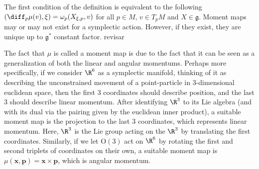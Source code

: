 
The first condition of the definition is equivalent to the following \(  ( \diff_p\mu(v), \xi)=\omega_p(X_{\xi, p}, v)\) for all \(p \in M\), \(v \in T_pM\) and \(X \in \mathfrak{g}\). Moment maps may or may not exist for a symplectic action. However, if they exist, they are unique up to \(\mathfrak{g}^*\) constant factor. {\color{red} revisar} 
 
\begin{obs}
    The fact that \(\mu\) is called a moment map is due to the fact that it can be seen as a generalization of both the linear and angular momentums. Perhaps more specifically, if we consider \(\R^6\) as a symplectic manifold, thinking of it as describing the unconstrained movement of a point-particle in \(3\)-dimensional euclidean space, then the first \(3\) coordinates should describe position, and the last \(3\) should describe linear momentum. After identifying \(\R^3\) to its Lie algebra (and with its dual via the pairing given by the euclidean inner product), a suitable moment map is the projection to the last \(3\) coordinates, which represents linear momentum. Here, \(\R^3\) is the Lie group acting on the \(\R^3\) by translating the first coordinates. Similarly, if we let \(\mathrm{O}(3)\) act on \(\R^6\) by rotating the first and second triplets of coordinates on their own, a suitable moment map is \(\mu(\bm{x}, \bm{p})=\bm{x} \times \bm{p}\), which is angular momentum.
\end{obs}

